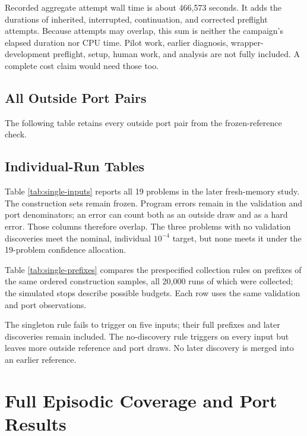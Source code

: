\documentclass[10pt,letterpaper]{article}
\begin{document}
Recorded aggregate attempt wall time is about 466,573 seconds. It adds the durations of
inherited, interrupted, continuation, and corrected preflight attempts. Because attempts
may overlap, this sum is neither the campaign's elapsed duration nor CPU time. Pilot work,
earlier diagnosis, wrapper-development preflight, setup, human work, and analysis are not
fully included. A complete cost claim would need those too.

\subsection{All Outside Port Pairs}\label{all-outside-port-pairs}

The following table retains every outside port pair from the frozen-reference check.



\subsection{Individual-Run Tables}\label{individual-run-tables}

Table \ref{tab:single-inputs} reports all 19 problems in the later fresh-memory study. The
construction sets remain frozen. Program errors remain in the validation and port
denominators; an error can count both as an outside draw and as a hard error. Those
columns therefore overlap. The three problems with no validation discoveries meet the
nominal, individual \(10^{-4}\) target, but none meets it under the 19-problem confidence
allocation.



Table \ref{tab:single-prefixes} compares the prespecified collection rules on prefixes of
the same ordered construction samples, all 20,000 runs of which were collected; the
simulated stops describe possible budgets. Each row uses the same validation and port
observations.

The singleton rule fails to trigger on five inputs; their full prefixes and later
discoveries remain included. The no-discovery rule triggers on every input but leaves more
outside reference and port draws. No later discovery is merged into an earlier reference.



\clearpage

\section{Full Episodic Coverage and Port Results}\label{app:episodic-detail}
\end{document}
